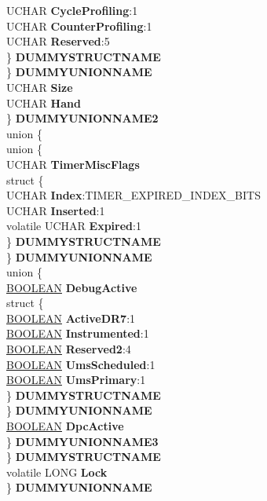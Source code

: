 \begin{DoxyCompactItemize}
\begin{tabbing}
\>\>\>\>\>UCHAR {\bfseries CycleProfiling}:1\\
\>\>\>\>\>UCHAR {\bfseries CounterProfiling}:1\\
\>\>\>\>\>UCHAR {\bfseries Reserved}:5\\
\>\>\>\>\} {\bfseries DUMMYSTRUCTNAME}\\
\>\>\>\} {\bfseries DUMMYUNIONNAME}\\
\>\>\>UCHAR {\bfseries Size}\\
\>\>\>UCHAR {\bfseries Hand}\\
\>\>\} {\bfseries DUMMYUNIONNAME2}\\
\>\>union \{\\
\>\>\>union \{\\
\>\>\>\>UCHAR {\bfseries TimerMiscFlags}\\
\>\>\>\>struct \{\\
\>\>\>\>\>UCHAR {\bfseries Index}:TIMER\_EXPIRED\_INDEX\_BITS\\
\>\>\>\>\>UCHAR {\bfseries Inserted}:1\\
\>\>\>\>\>volatile UCHAR {\bfseries Expired}:1\\
\>\>\>\>\} {\bfseries DUMMYSTRUCTNAME}\\
\>\>\>\} {\bfseries DUMMYUNIONNAME}\\
\>\>\>union \{\\
\>\>\>\>\hyperlink{_processor_bind_8h_a112e3146cb38b6ee95e64d85842e380a}{BOOLEAN} {\bfseries DebugActive}\\
\>\>\>\>struct \{\\
\>\>\>\>\>\hyperlink{_processor_bind_8h_a112e3146cb38b6ee95e64d85842e380a}{BOOLEAN} {\bfseries ActiveDR7}:1\\
\>\>\>\>\>\hyperlink{_processor_bind_8h_a112e3146cb38b6ee95e64d85842e380a}{BOOLEAN} {\bfseries Instrumented}:1\\
\>\>\>\>\>\hyperlink{_processor_bind_8h_a112e3146cb38b6ee95e64d85842e380a}{BOOLEAN} {\bfseries Reserved2}:4\\
\>\>\>\>\>\hyperlink{_processor_bind_8h_a112e3146cb38b6ee95e64d85842e380a}{BOOLEAN} {\bfseries UmsScheduled}:1\\
\>\>\>\>\>\hyperlink{_processor_bind_8h_a112e3146cb38b6ee95e64d85842e380a}{BOOLEAN} {\bfseries UmsPrimary}:1\\
\>\>\>\>\} {\bfseries DUMMYSTRUCTNAME}\\
\>\>\>\} {\bfseries DUMMYUNIONNAME}\\
\>\>\>\hyperlink{_processor_bind_8h_a112e3146cb38b6ee95e64d85842e380a}{BOOLEAN} {\bfseries DpcActive}\\
\>\>\} {\bfseries DUMMYUNIONNAME3}\\
\>\} {\bfseries DUMMYSTRUCTNAME}\\
\>volatile LONG {\bfseries Lock}\\
\} {\bfseries DUMMYUNIONNAME}\\


\end{tabbing}
\end{DoxyCompactItemize}
